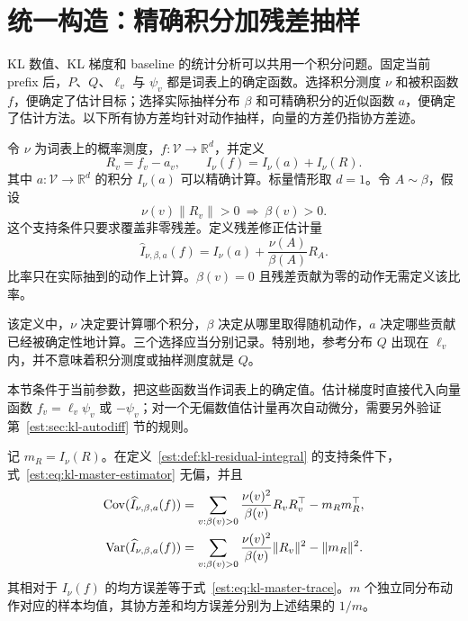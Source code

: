 \section{统一构造：精确积分加残差抽样}
\label{est:sec:kl-residual-framework}

KL 数值、KL 梯度和 baseline 的统计分析可以共用一个积分问题。固定当前 prefix 后，$P$、$Q$、$\ell_v$ 与 $\psi_v$ 都是词表上的确定函数。选择积分测度 $\nu$ 和被积函数 $f$，便确定了估计目标；选择实际抽样分布 $\beta$ 和可精确积分的近似函数 $a$，便确定了估计方法。以下所有协方差均针对动作抽样，向量的方差仍指协方差迹。

\begin{definition}[可精确积分的近似函数与残差]
\label{est:def:kl-residual-integral}
令 $\nu$ 为词表上的概率测度，$f:\mathcal V\to\mathbb R^d$，并定义
\begin{equation*}
 R_v=f_v-a_v,\qquad I_\nu(f)=I_\nu(a)+I_\nu(R).
\end{equation*}
其中 $a:\mathcal V\to\mathbb R^d$ 的积分 $I_\nu(a)$ 可以精确计算。标量情形取 $d=1$。令 $A\sim\beta$，假设
\begin{equation*}
 \nu(v)\lVert R_v\rVert>0\ \Longrightarrow\ \beta(v)>0.
\end{equation*}
这个支持条件只要求覆盖非零残差。定义残差修正估计量
\begin{equation}
 \widehat I_{\nu,\beta,a}(f)
 =I_\nu(a)+\frac{\nu(A)}{\beta(A)}R_A.
 \label{est:eq:kl-master-estimator}
\end{equation}
比率只在实际抽到的动作上计算。$\beta(v)=0$ 且残差贡献为零的动作无需定义该比率。
\end{definition}

该定义中，$\nu$ 决定要计算哪个积分，$\beta$ 决定从哪里取得随机动作，$a$ 决定哪些贡献已经被确定性地计算。三个选择应当分别记录。特别地，参考分布 $Q$ 出现在 $\ell_v$ 内，并不意味着积分测度或抽样测度就是 $Q$。

本节条件于当前参数，把这些函数当作词表上的确定值。估计梯度时直接代入向量函数 $f_v=\ell_v\psi_v$ 或 $-\psi_v$；对一个无偏数值估计量再次自动微分，需要另外验证第~\ref{est:sec:kl-autodiff} 节的规则。

\begin{theorem}
\label{est:thm:kl-master-moments}
记 $m_R=I_\nu(R)$。在定义~\ref{est:def:kl-residual-integral} 的支持条件下，式~\eqref{est:eq:kl-master-estimator} 无偏，并且
\begin{align}
 \operatorname{Cov}(\widehat I_{\nu,\beta,a}(f))
 &=\sum_{v:\beta(v)>0}\frac{\nu(v)^2}{\beta(v)}R_vR_v^\top-m_Rm_R^\top,
 \label{est:eq:kl-master-cov}\\
 \operatorname{Var}(\widehat I_{\nu,\beta,a}(f))
 &=\sum_{v:\beta(v)>0}\frac{\nu(v)^2}{\beta(v)}\lVert R_v\rVert^2-\lVert m_R\rVert^2.
 \label{est:eq:kl-master-trace}
\end{align}
其相对于 $I_\nu(f)$ 的均方误差等于式~\eqref{est:eq:kl-master-trace}。$m$ 个独立同分布动作对应的样本均值，其协方差和均方误差分别为上述结果的 $1/m$。
\end{theorem}

